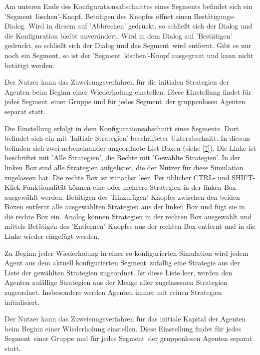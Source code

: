 \documentclass[parskip=full,11pt]{scrartcl}
\def\segment{Segment}
\begin{document}
Am unteren Ende des Konfigurationsabschnittes eines \segment s befindet sich ein '\segment\ löschen'-Knopf. Betätigen des Knopfes öffnet einen Bestätigungs-Dialog. Wird in diesem auf 'Abbrechen' gedrückt, so schließt sich der Dialog und die Konfiguration bleibt unverändert. Wird in dem Dialog auf 'Bestätigen' gedrückt, so schließt sich der Dialog und das \segment\ wird entfernt. Gibt es nur noch ein \segment, so ist der '\segment\ löschen'-Knopf ausgegraut und kann nicht betätigt werden.

Der Nutzer kann das Zuweisungsverfahren für die initialen Strategien der Agenten beim Beginn einer Wiederholung einstellen. Diese Einstellung findet für jedes \segment\ einer Gruppe und für jedes \segment\ der gruppenlosen Agenten separat statt.

Die Einstellung erfolgt in dem Konfigurationsabschnitt eines \segment s. Dort befindet sich ein mit 'Initiale Strategien' beschrifteter Unterabschnitt. In diesem befinden sich zwei nebeneinander angeordnete List-Boxen (siehe \cref{?}). Die Linke ist beschriftet mit 'Alle Strategien', die Rechte mit 'Gewählte Strategien'. In der linken Box sind alle Strategien aufgelistet, die der Nutzer für diese Simulation zugelassen hat. Die rechte Box ist zunächst leer. Per üblicher \textsf{CTRL}- und \textsf{SHIFT}-Klick-Funktionalität können eine oder mehrere Strategien in der linken Box ausgewählt werden. Betätigen des 'Hinzufügen'-Knopfes zwischen den beiden Boxen entfernt alle ausgewählten Strategien aus der linken Box und fügt sie in die rechte Box ein. Analog können Strategien in der rechten Box ausgewählt und mittels Betätigen des 'Entfernen'-Knopfes aus der rechten Box entfernt und in die Linke wieder eingefügt werden.

Zu Beginn jeder Wiederholung in einer so konfigurierten Simulation wird jedem Agent aus dem aktuell konfigurierten \segment\ zufällig eine Strategie aus der Liste der gewählten Strategien zugeordnet. Ist diese Liste leer, werden den Agenten zufällige Strategien aus der Menge aller zugelassenen Strategien zugeordnet. Insbesondere werden Agenten immer mit reinen Strategien initialisiert.

Der Nutzer kann das Zuweisungsverfahren für das initiale Kapital der Agenten beim Beginn einer Wiederholung einstellen. Diese Einstellung findet für jedes \segment\ einer Gruppe und für jedes \segment\ der gruppenlosen Agenten separat statt.
\end{document}
